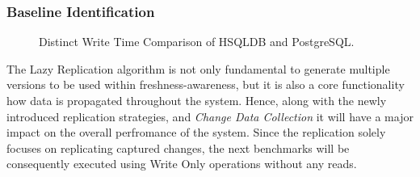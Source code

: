 \subsubsection{Baseline Identification} 




\begin{figure}[t] 
    \centering 
    \caption{Distinct Write Time Comparison of HSQLDB and PostgreSQL.}
    \label{fig:singlepsqlhsql}
\end{figure}

The Lazy Replication algorithm is not only fundamental to generate multiple versions to be used within freshness-awareness,
but it is also a core functionality how data is propagated throughout the system. 
Hence, along with the newly introduced replication strategies, and \emph{Change Data Collection} it will have a major impact on the overall perfromance of the system.
Since the replication solely focuses on replicating captured changes, the next benchmarks will be consequently executed using Write Only operations without any reads.


